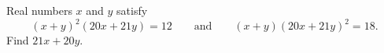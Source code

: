 Real numbers $x$ and $y$ satisfy
\[(x+y)^2(20x+21y)=12\qquad\text{and}\qquad(x+y)(20x+21y)^2=18.\]
Find $21x+20y$.
